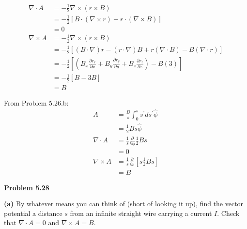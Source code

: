 \documentclass{article}
\begin{document}
\begin{equation*}
\begin{split}
	\nabla \cdot A & = - \frac{1}{2} \nabla \times (r \times B) \\
	& = - \frac{1}{2} [B \cdot (\nabla \times r) - r \cdot (\nabla \times B)] \\
	& = \boxed{0} \\
	\nabla \times A & = - \frac{1}{2} \nabla \times (r \times B) \\
	& = - \frac{1}{2} [(B \cdot \nabla) r - (r \cdot \nabla) B + r (\nabla \cdot B) - B (\nabla \cdot r)] \\
	& = - \frac{1}{2} [(B_x \frac{\partial r_x}{\partial x} + B_y \frac{\partial r_y}{\partial y} + B_z \frac{\partial r_z}{\partial z}) - B (3)] \\
	& = - \frac{1}{2} [B - 3 B] \\
	& = \boxed{B}
\end{split}
\end{equation*}

From Problem 5.26.b:
\begin{equation*}
\begin{split}
	A & = \frac{B}{s} \int_0^s s^\prime ds^\prime \hat{\phi} \\
	& = \boxed{\frac{1}{2} B s \hat{\phi}} \\
	\nabla \cdot A & = \frac{1}{s} \frac{\partial}{\partial \phi} \frac{1}{2} B s \\
	& = 0 \\
	\nabla \times A & = \frac{1}{s} \frac{\partial}{\partial s} [s \frac{1}{2} B s] \\
	& = B
\end{split}
\end{equation*}

\textbf{Problem 5.28}

\textbf{(a)}
By whatever means you can think of (short of looking it up), find the vector potential a distance $s$ from an infinite straight wire carrying a current $I$.
Check that $\nabla \cdot A = 0$ and $\nabla \times A = B$.
\end{document}
